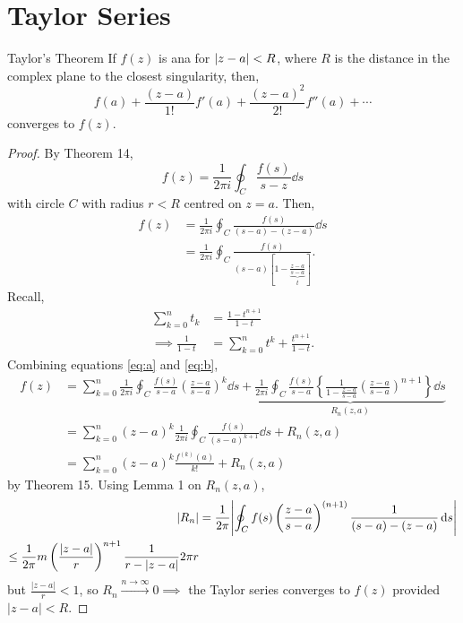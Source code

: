 \documentclass{book}
\begin{document}
\section{Taylor Series}
\begin{Theorems}{Taylor's Theorem}{}
If $f(z)$ is ana for $\abs{z -a} < R$, where $R$ is the distance in the complex plane to the closest singularity, then,
\begin{equation}
	f(a) + \frac{(z-a)}{1!}f'(a) + \frac{(z-a)^2}{2!}f''(a) + \cdots 
\end{equation}
converges to $f(z)$.
\end{Theorems}
\begin{proof}
	By Theorem 14, 
	\begin{equation}
		f(z) = \frac{1}{2\pi i }\oint_C \frac{f(s)}{s-z}\dd{s}
	\end{equation}
	with circle $C$ with radius $r < R$ centred on $z = a$. Then,
	\begin{align}
		f(z) & = \frac{1}{2\pi i }\oint_C \frac{f(s)}{(s-a)-(z-a)}\dd{s} \\
		& = \frac{1}{2\pi i}\oint_C \frac{f(s)}{(s-a)\left[1- \underbrace{\frac{z-a}{s-a}}_t\right]}. \label{eq:a}
	\end{align}
	Recall,
	\begin{align}
		\sum_{k=0}^nt_k &= \frac{1-t^{n+1}}{1-t} \\
		\implies \frac{1}{1-t} &= \sum_{k=0}^{n}t^k + \frac{t^{n+1}}{1-t}\label{eq:b}.
	\end{align}
	Combining equations \eqref{eq:a} and \eqref{eq:b},
	\begin{align}
		f(z) &= \sum_{k=0}^{n}\frac{1}{2\pi i }\oint_C\frac{f(s)}{s-a}\left(\frac{z-a}{s-a}\right)^k \dd{s} + \underbrace{\frac{1}{2\pi i}\oint_C \frac{f(s)}{s-a}\left\{\frac{1}{1-\frac{z-a}{s-a}}\left(\frac{z-a}{s-a}\right)^{n+1}\right\}\dd{s}}_{R_n(z,a)} \\
		& = \sum_{k=0}^n(z-a)^k\frac{1}{2\pi i}\oint_C\frac{f(s)}{(s-a)^{k+1}}\dd{s} + R_n(z,a) \\
		& = \sum_{k=0}^n(z-a)^k\frac{f^{(k)}(a)}{k!} + R_n(z,a)
	\end{align}
	by Theorem 15. Using Lemma 1 on $R_n(z,a)$,
	\begin{align}
		|R_n| & =\frac{1}{2\pi}\abs{\oint_Cf(s)\left(\frac{z-a}{s-a}\right)^{(n+1)}\frac{1}{(s-a) - (z-a)}\dd{s}} \\
		\leq \frac{1}{2\pi}m\left(\frac{|z-a|}{r}\right)^{n+1}\frac{1}{r-|z-a|}2\pi r
	\end{align}
	but $\frac{|z-a|}{r} < 1$, so $R_n \xrightarrow{n \to \infty} 0 \implies$ the Taylor series converges to $f(z)$ provided $|z - a| < R$.
\end{proof}
\end{document}
